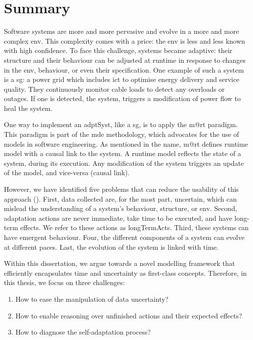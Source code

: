 \section{Summary}

Software systems are more and more pervasive and evolve in a more and more complex \gls{env}.
This complexity comes with a price: the \gls{env} is less and less known with high confidence.
To face this challenge, systems became adaptive: their \gls{structure} and their \gls{behaviour} can be adjusted at runtime in response to changes in the \gls{env}, \gls{behaviour}, or even their specification.
One example of such a system is a \gls{sg}: a power grid which includes \gls{ict} to optimise energy delivery and service quality.
They continuously monitor cable loads to detect any overloads or outages.
If one is detected, the system, triggers a modification of power flow to heal the system.

One way to implement an \gls{adptSyst}, like a \gls{sg}, is to apply the \gls{m@rt} paradigm.
This paradigm is part of the \gls{mde} methodology, which advocates for the use of \glspl{model} in software engineering.
As mentioned in the name, \gls{m@rt} defines runtime \gls{model} with a causal link to the system.
A runtime \gls{model} reflects the state of a system, during its execution.
Any modification of the system triggers an update of the \gls{model}, and vice-versa (causal link).

However, we have identified five problems that can reduce the usability of this approach (\cf {}).
First, data collected are, for the most part, uncertain, which can mislead the understanding of a system's \gls{behaviour}, \gls{structure}, or \gls{env}.
Second, adaptation \glspl{action} are never immediate, take time to be executed, and have long-term effects.
We refer to these \glspl{action} as \glspl{longTermAct}.
Third, these systems can have emergent \gls{behaviour}.
Four, the different components of a system can evolve at different paces.
Last, the evolution of the system is linked with time.

Within this dissertation, we argue towards a novel modelling framework that efficiently encapsulates time and uncertainty as first-class concepts.
Therefore, in this thesis, we focus on three challenges:
\begin{enumerate}
	\vspace{-0.5em}
	\setlength\itemsep{-0.3em}
	\item How to ease the manipulation of data uncertainty?
	\item How to enable reasoning over unfinished actions and their expected effects?
	\item How to diagnose the self-adaptation process?
\end{enumerate}

